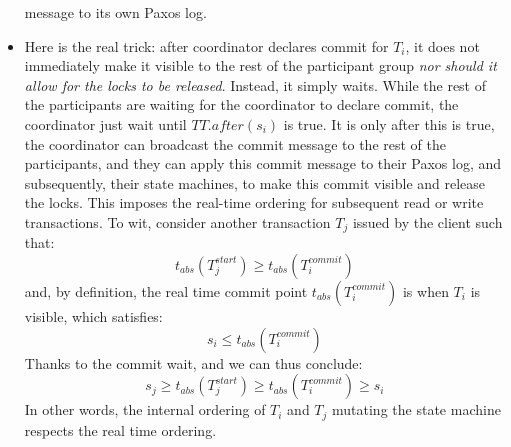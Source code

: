 \begin{itemize}
      message to its own Paxos log.
   \item Here is the real trick: after coordinator declares commit for $T_i$,
      it does not immediately make it visible to the rest of the participant
      group \textit{nor should it allow for the locks to be released}.
      Instead, it simply waits. While the rest of the participants are
      waiting for the coordinator to declare commit, the coordinator just
      wait until $TT.after(s_i)$ is true. It is only after this is true, the
      coordinator can broadcast the commit message to the rest of the
      participants, and they can apply this commit message to their Paxos
      log, and subsequently, their state machines, to make this commit
      visible and release the locks. This imposes the real-time ordering for
      subsequent read or write transactions. To wit, consider another
      transaction $T_j$ issued by the client such that:
      \[
         t_{abs}(T_j^{start}) \ge t_{abs}(T_i^{commit})
      \]
      and, by definition, the real time commit point $t_{abs}(T_i^{commit})$
      is when $T_i$ is visible, which satisfies:
      \[
         s_i \le t_{abs}(T_i^{commit})
      \]
      Thanks to the commit wait, and we can thus conclude:
      \[
         s_j \ge t_{abs}(T_j^{start}) \ge t_{abs}(T_i^{commit}) \ge s_i
      \]
      In other words, the internal ordering of $T_i$ and $T_j$ mutating the
      state machine respects the real time ordering.

\end{itemize}

